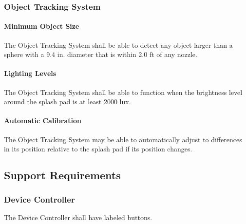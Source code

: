 \subsubsection{Object Tracking System}

\paragraph{Minimum Object Size}
The Object Tracking System shall be able to detect any object larger than a sphere with a 9.4 in. diameter that is within 2.0 ft of any nozzle.

\paragraph{Lighting Levels}
The Object Tracking System shall be able to function when the brightness level around the splash pad is at least 2000 lux.

\paragraph{Automatic Calibration}
The Object Tracking System may be able to automatically adjust to differences in its position relative to the splash pad if its position changes. 

\subsection{Support Requirements}

\subsubsection{Device Controller}
The Device Controller shall have labeled buttons.



